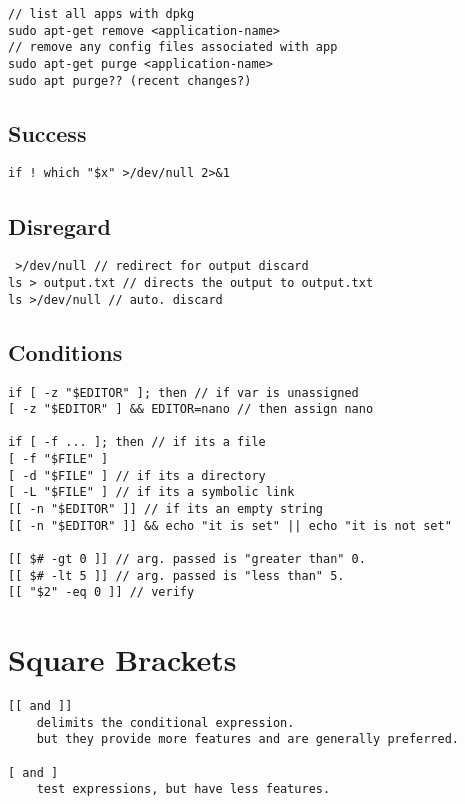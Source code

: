 \begin{verbatim}
// list all apps with dpkg
sudo apt-get remove <application-name>
// remove any config files associated with app
sudo apt-get purge <application-name>
sudo apt purge?? (recent changes?) 
\end{verbatim}

\subsection{Success}

\begin{verbatim}
if ! which "$x" >/dev/null 2>&1
\end{verbatim}

\subsection{Disregard}

\begin{verbatim}
 >/dev/null // redirect for output discard
ls > output.txt // directs the output to output.txt
ls >/dev/null // auto. discard
\end{verbatim}

\subsection{Conditions}

\begin{verbatim}
if [ -z "$EDITOR" ]; then // if var is unassigned
[ -z "$EDITOR" ] && EDITOR=nano // then assign nano

if [ -f ... ]; then // if its a file
[ -f "$FILE" ] 
[ -d "$FILE" ] // if its a directory
[ -L "$FILE" ] // if its a symbolic link 
[[ -n "$EDITOR" ]] // if its an empty string
[[ -n "$EDITOR" ]] && echo "it is set" || echo "it is not set"

[[ $# -gt 0 ]] // arg. passed is "greater than" 0.
[[ $# -lt 5 ]] // arg. passed is "less than" 5.
[[ "$2" -eq 0 ]] // verify 
\end{verbatim}

\section{Square Brackets}

\begin{verbatim}
[[ and ]] 
    delimits the conditional expression. 
    but they provide more features and are generally preferred.

[ and ]
    test expressions, but have less features.
\end{verbatim}

